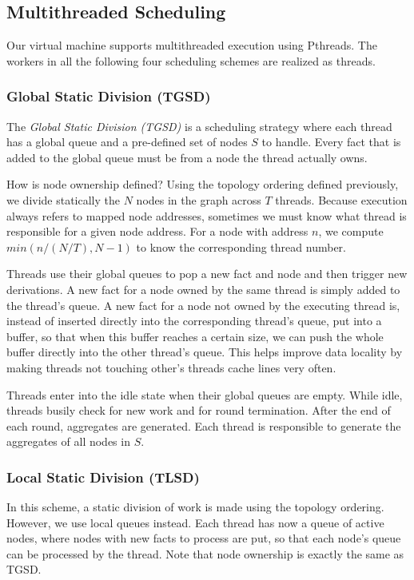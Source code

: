 \documentclass[preprint]{sigplanconf}
\begin{document}
\subsection{Multithreaded Scheduling}\label{sec:multithreading}

Our virtual machine supports multithreaded execution using Pthreads. The workers in all the
following four scheduling schemes are realized as threads.

\subsubsection{Global Static Division (TGSD)}

The \emph{Global Static Division (TGSD)} is a scheduling strategy where each thread
has a global queue and a pre-defined set of nodes $S$ to handle. Every fact that is added
to the global queue must be from a node the thread actually owns.

How is node ownership defined? Using the topology ordering defined previously, we divide
statically the $N$ nodes in the graph across $T$ threads. Because execution
always refers to mapped node addresses, sometimes we must know what thread is responsible for a given
node address. For a node with address $n$, we compute $min(n / (N/T), N-1)$ to know
the corresponding thread number.

Threads use their global queues to pop a new fact and node and then trigger new derivations.
A new fact for a node owned by the same thread is simply added to the thread's queue.
A new fact for a node not owned by the executing thread is, instead of inserted directly
into the corresponding thread's queue, put into a buffer, so that when this buffer reaches
a certain size, we can push the whole buffer directly into the other thread's queue.
This helps improve data locality by making threads not touching other's threads cache lines very often.

Threads enter into the idle state when their global queues are empty. While idle, threads
busily check for new work and for round termination. After the end of each round,
aggregates are generated. Each thread is responsible to generate the aggregates of all
nodes in $S$.

\subsubsection{Local Static Division (TLSD)}

In this scheme, a static division of work is made using the topology ordering. However,
we use local queues instead. Each thread has now a queue of active nodes, where nodes with new
facts to process are put, so that each node's queue can be processed by the thread.
Note that node ownership is exactly the same as TGSD.
\end{document}

